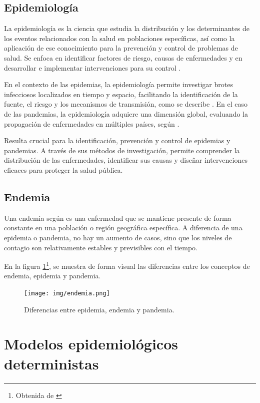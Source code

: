 \subsection{Epidemiología}
La epidemiología es la ciencia que estudia la distribución y los determinantes de los eventos relacionados con la salud en poblaciones específicas, así como la aplicación de ese conocimiento para la prevención y control de problemas de salud. Se enfoca en identificar factores de riesgo, causas de enfermedades y en desarrollar e implementar intervenciones para su control \cite{hajat2010introduction}.

En el contexto de las epidemias, la epidemiología permite investigar brotes infecciosos localizados en tiempo y espacio, facilitando la identificación de la fuente, el riesgo y los mecanismos de transmisión, como se describe \cite{riley2019differentiating}. En el caso de las pandemias, la epidemiología adquiere una dimensión global, evaluando la propagación de enfermedades en múltiples países, según \cite{piret2021pandemics}. 

Resulta crucial para la identificación, prevención y control de epidemias y pandemias. A través de sus métodos de investigación, permite comprender la distribución de las enfermedades, identificar sus causas y diseñar intervenciones eficaces para proteger la salud pública.

\subsection{Endemia}
Una endemia según \cite{ranm_endemia} es una enfermedad que se mantiene presente de forma constante en una población o región geográfica específica. A diferencia de una epidemia o pandemia, no hay un aumento de casos, sino que los niveles de contagio son relativamente estables y previsibles con el tiempo.

En la figura \ref{fig:difernecias}\footnote{Obtenida de \cite{rie2020covid}}, se muestra de forma visual las diferencias entre los conceptos de endemia, epidemia y pandemia.


\begin{figure}[H]
        \centering
        \texttt{[image: img/endemia.png]}
        \caption{Diferencias entre epidemia, endemia y pandemia.}
        \label{fig:difernecias}
        \vspace{0.5cm} %
    \end{figure}


\section{Modelos epidemiológicos  deterministas}
